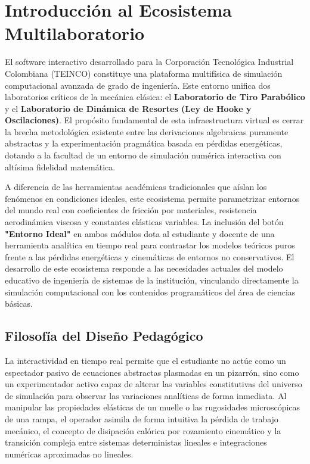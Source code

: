 \documentclass[11pt,a4paper]{article}
\begin{document}
	\section{Introducción al Ecosistema Multilaboratorio}
	El software interactivo desarrollado para la Corporación Tecnológica Industrial Colombiana (TEINCO) constituye una plataforma multifísica de simulación computacional avanzada de grado de ingeniería. Este entorno unifica dos laboratorios críticos de la mecánica clásica: el \textbf{Laboratorio de Tiro Parabólico} y el \textbf{Laboratorio de Dinámica de Resortes (Ley de Hooke y Oscilaciones)}. El propósito fundamental de esta infraestructura virtual es cerrar la brecha metodológica existente entre las derivaciones algebraicas puramente abstractas y la experimentación pragmática basada en pérdidas energéticas, dotando a la facultad de un entorno de simulación numérica interactiva con altísima fidelidad matemática.
	
	A diferencia de las herramientas académicas tradicionales que aíslan los fenómenos en condiciones ideales, este ecosistema permite parametrizar entornos del mundo real con coeficientes de fricción por materiales, resistencia aerodinámica viscosa y constantes elásticas variables. La inclusión del botón \textbf{"Entorno Ideal"} en ambos módulos dota al estudiante y docente de una herramienta analítica en tiempo real para contrastar los modelos teóricos puros frente a las pérdidas energéticas y cinemáticas de entornos no conservativos. El desarrollo de este ecosistema responde a las necesidades actuales del modelo educativo de ingeniería de sistemas de la institución, vinculando directamente la simulación computacional con los contenidos programáticos del área de ciencias básicas.
	
	\subsection{Filosofía del Diseño Pedagógico}
	La interactividad en tiempo real permite que el estudiante no actúe como un espectador pasivo de ecuaciones abstractas plasmadas en un pizarrón, sino como un experimentador activo capaz de alterar las variables constitutivas del universo de simulación para observar las variaciones analíticas de forma inmediata. Al manipular las propiedades elásticas de un muelle o las rugosidades microscópicas de una rampa, el operador asimila de forma intuitiva la pérdida de trabajo mecánico, el concepto de disipación calórica por rozamiento cinemático y la transición compleja entre sistemas deterministas lineales e integraciones numéricas aproximadas no lineales.
	
\end{document}
